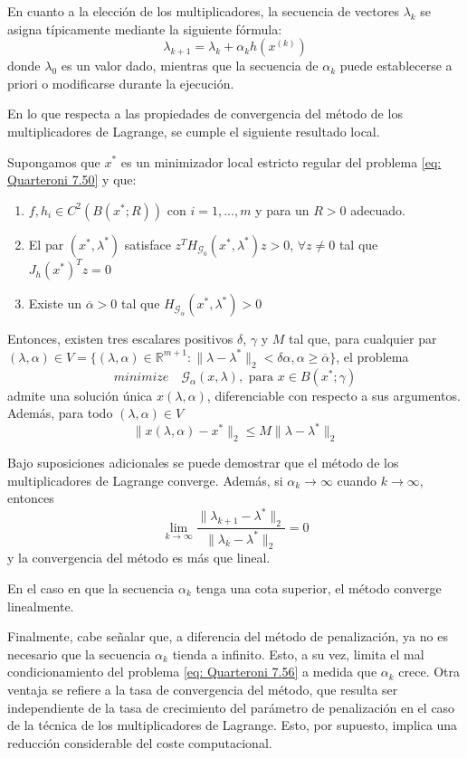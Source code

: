 En cuanto a la elección de los multiplicadores, la secuencia de vectores $\lambda_k$ se asigna típicamente mediante la siguiente fórmula:
\[ \lambda_{k + 1} = \lambda_k + \alpha_k h (x^{(k)}) \]
donde $\lambda_0$ es un valor dado, mientras que la secuencia de $\alpha_k$ puede establecerse a priori o modificarse durante la ejecución.

En lo que respecta a las propiedades de convergencia del método de los multiplicadores de Lagrange, se cumple el siguiente resultado local.

\begin{property}
    Supongamos que $x^*$ es un minimizador local estricto regular del problema \ref{eq: Quarteroni 7.50} y que:
    \begin{enumerate}
        \item $f, h_i \in C^2 (B (x^*; R))$ con $i = 1,..., m$ y para un $R > 0$ adecuado.
        \item El par $(x^*, \lambda^*)$ satisface $z^T H_{\mathcal{G}_0} (x^*, \lambda^*) z > 0$, $\forall z \neq 0$ tal que $J_h(x^*)^T z = 0$
        \item Existe un $\overline{\alpha} > 0$ tal que $H_{\mathcal{G}_{\overline{\alpha}}} (x^*, \lambda^*) > 0$
    \end{enumerate}

    Entonces, existen tres escalares positivos $\delta$, $\gamma$ y $M$ tal que, para cualquier par $(\lambda, \alpha) \in V = \{ (\lambda, \alpha) \in \mathbb{R}^{m + 1} : \|\lambda - \lambda^*\|_2 < \delta \alpha, \alpha \geq \overline{\alpha} \}$, el problema
    \[ minimize \quad \mathcal{G}_\alpha (x, \lambda), \text{ para } x \in B(x^*; \gamma) \]
    admite una solución única $x(\lambda, \alpha)$, diferenciable con respecto a sus argumentos. Además, para todo $(\lambda, \alpha) \in V$
    \[ \| x(\lambda, \alpha) - x^* \|_2 \leq M \| \lambda - \lambda^* \|_2 \]
\end{property}

Bajo suposiciones adicionales se puede demostrar que el método de los multiplicadores de Lagrange converge. Además, si $\alpha_k \rightarrow \infty$ cuando $k \rightarrow \infty$, entonces
\[ \lim_{k \rightarrow \infty} \frac{\| \lambda_{k + 1} - \lambda^* \|_2}{\| \lambda_k - \lambda^* \|_2} = 0 \]
y la convergencia del método es más que lineal.

En el caso en que la secuencia $\alpha_k$ tenga una cota superior, el método converge linealmente.

Finalmente, cabe señalar que, a diferencia del método de penalización, ya no es necesario que la secuencia $\alpha_k$ tienda a infinito. Esto, a su vez, limita el mal condicionamiento del problema \ref{eq: Quarteroni 7.56} a medida que $\alpha_k$ crece. Otra ventaja se refiere a la tasa de convergencia del método, que resulta ser independiente de la tasa de crecimiento del parámetro de penalización en el caso de la técnica de los multiplicadores de Lagrange. Esto, por supuesto, implica una reducción considerable del coste computacional.